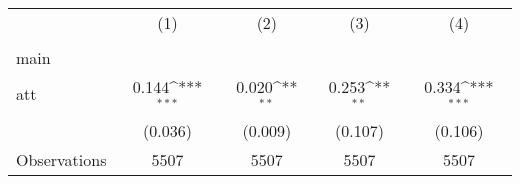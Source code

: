 {
\def\sym#1{\ifmmode^{#1}\else\(^{#1}\)\fi}
\begin{tabular}{l*{4}{c}}
\hline\hline
                    &\multicolumn{1}{c}{(1)}&\multicolumn{1}{c}{(2)}&\multicolumn{1}{c}{(3)}&\multicolumn{1}{c}{(4)}\\
                    &\multicolumn{1}{c}{} &\multicolumn{1}{c}{} &\multicolumn{1}{c}{} &\multicolumn{1}{c}{} \\
\hline
main                &                     &                     &                     &                     \\
att                 &       0.144\sym{***}&       0.020\sym{**} &       0.253\sym{**} &       0.334\sym{***}\\
                    &     (0.036)         &     (0.009)         &     (0.107)         &     (0.106)         \\
\hline
Observations        &        5507         &        5507         &        5507         &        5507         \\
\hline\hline
\end{tabular}
}

